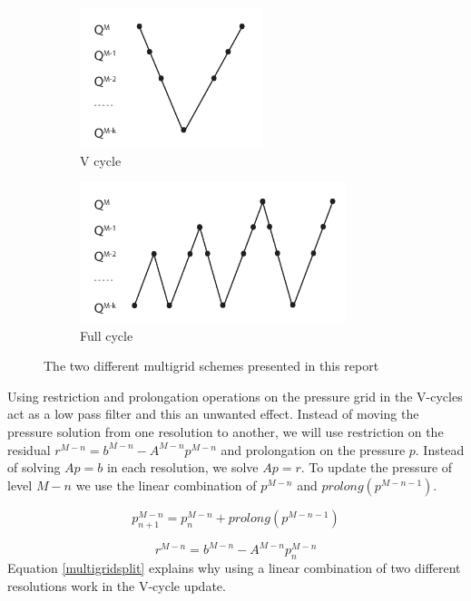 \begin{figure}[ht!]
\centering
\begin{subfigure}[]{0.4\textwidth}
\includegraphics[height=41mm]{img/vcycle.pdf}
\caption{V cycle}
\end{subfigure}
\begin{subfigure}[]{0.5\textwidth}
\includegraphics[height=41mm]{img/fullcycle.pdf}
\caption{Full cycle}
\end{subfigure}
\caption{The two different multigrid schemes presented in this report}
\label{multigrid}
\end{figure}
\noindent
Using restriction and prolongation operations on the pressure grid in the V-cycles act as a low pass filter and this an unwanted effect. Instead of moving the pressure solution from one resolution to another, we will use restriction on the residual $r^{M-n} = b^{M-n} - A^{M-n}p^{M-n}$ and prolongation on the pressure $p$. Instead of solving $Ap = b$ in each resolution, we solve $Ap = r$. To update the pressure of level $M-n$ we use the linear combination of $p^{M-n}$ and $prolong(p^{M-n-1})$.

\begin{equation}
p^{M-n}_{n+1} = p^{M-n}_n + prolong(p^{M-n-1})
\end{equation}

\begin{equation}
r^{M-n} = b^{M-n} - A^{M-n} p^{M-n}_n 
\end{equation}
\noindent
Equation \ref{multigridsplit} explains why using a linear combination of two different resolutions work in the V-cycle update.

